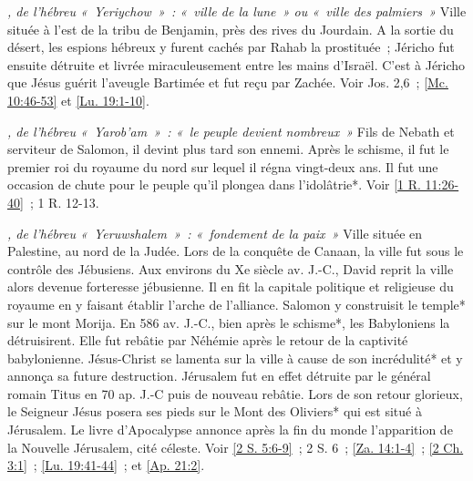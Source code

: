 \begin{multicols}{2}
\textit{, de l'hébreu «~Yeriychow~»~: «~ville de la lune~» ou «~ville des palmiers~»}\newline
Ville située à l'est de la tribu de Benjamin, près des rives du Jourdain. A la sortie du désert, les espions hébreux y furent cachés par Rahab la prostituée~; Jéricho fut ensuite détruite et livrée miraculeusement entre les mains d'Israël. C'est à Jéricho que Jésus guérit l'aveugle Bartimée et fut reçu par Zachée.\newline
Voir Jos. 2,6~; \vref{Mc. 10:46-53} et \vref{Lu. 19:1-10}.

\textit{, de l'hébreu «~Yarob'am~»~: «~le peuple devient nombreux~»}\newline
Fils de Nebath et serviteur de Salomon, il devint plus tard son ennemi. Après le schisme, il fut le premier roi du royaume du nord sur lequel il régna vingt-deux ans. Il fut une occasion de chute pour le peuple qu'il plongea dans l'idolâtrie*. Voir \vref{1 R. 11:26-40}~; 1 R. 12-13.

\textit{, de l'hébreu «~Yeruwshalem~»~: «~fondement de la paix~»}\newline
Ville située en Palestine, au nord de la Judée. Lors de la conquête de Canaan, la ville fut sous le contrôle des Jébusiens. Aux environs du Xe siècle av. J.-C., David reprit la ville alors devenue forteresse jébusienne. Il en fit la capitale politique et religieuse du royaume en y faisant établir l'arche de l'alliance. Salomon y construisit le temple* sur le mont Morija. En 586 av. J.-C., bien après le schisme*, les Babyloniens la détruisirent. Elle fut rebâtie par Néhémie après le retour de la captivité babylonienne. Jésus-Christ se lamenta sur la ville à cause de son incrédulité* et y annonça sa future destruction. Jérusalem fut en effet détruite par le général romain Titus en 70 ap. J.-C puis de nouveau rebâtie. Lors de son retour glorieux, le Seigneur Jésus posera ses pieds sur le Mont des Oliviers* qui est situé à Jérusalem. Le livre d'Apocalypse annonce après la fin du monde l'apparition de la Nouvelle Jérusalem, cité céleste.\newline
Voir \vref{2 S. 5:6-9}~; 2 S. 6~; \vref{Za. 14:1-4}~; \vref{2 Ch. 3:1}~; \vref{Lu. 19:41-44}~; et \vref{Ap. 21:2}.


\end{multicols}
